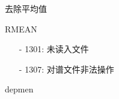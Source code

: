\label{cmd:rmean}

去除平均值

\begin{SACSTX}
RMEAN
\end{SACSTX}

\begin{itemize}
\item[-]1301: 未读入文件
\item[-]1307: 对谱文件非法操作
\end{itemize}

depmen
